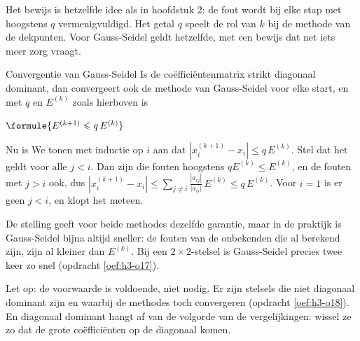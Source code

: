 Het bewijs is hetzelfde idee als in hoofdstuk 2: de fout wordt bij elke stap met hoogstens $q$ vermenigvuldigd. Het getal $q$ speelt de rol van $k$ bij de methode van de dekpunten. Voor Gauss-Seidel geldt hetzelfde, met een bewijs dat net iets meer zorg vraagt.

\begin{theorie}
\begin{stelling}{Convergentie van Gauss-Seidel}
Is de coëfficiëntenmatrix strikt diagonaal dominant, dan convergeert ook de methode van Gauss-Seidel voor elke start, en met $q$ en $E^{(k)}$ zoals hierboven is

\vspace{1mm}
\qquad $\formule{E^{(k+1)} \leqslant q\,E^{(k)}}$
\end{stelling}

\begin{bewijs}
Nu is
We tonen met inductie op $i$ aan dat $|x_i^{(k+1)} - x_i| \leqslant q\,E^{(k)}$. Stel dat het geldt voor alle $j < i$. Dan zijn die fouten hoogstens $q E^{(k)} \leqslant E^{(k)}$, en de fouten met $j > i$ ook, dus $|x_i^{(k+1)} - x_i| \leqslant \sum_{j \neq i} \frac{|a_{ij}|}{|a_{ii}|}\,E^{(k)} \leqslant q\,E^{(k)}$. Voor $i = 1$ is er geen $j < i$, en klopt het meteen.
\end{bewijs}
\end{theorie}

De stelling geeft voor beide methodes dezelfde garantie, maar in de praktijk is Gauss-Seidel bijna altijd sneller: de fouten van de onbekenden die al berekend zijn, zijn al kleiner dan $E^{(k)}$. Bij een $2 \times 2$-stelsel is Gauss-Seidel precies twee keer zo snel (opdracht \ref{oef:h3-o17}).

Let op: de voorwaarde is voldoende, niet nodig. Er zijn stelsels die niet diagonaal dominant zijn en waarbij de methodes toch convergeren (opdracht \ref{oef:h3-o18}). En diagonaal dominant hangt af van de volgorde van de vergelijkingen: wissel ze zo dat de grote coëfficiënten op de diagonaal komen.

